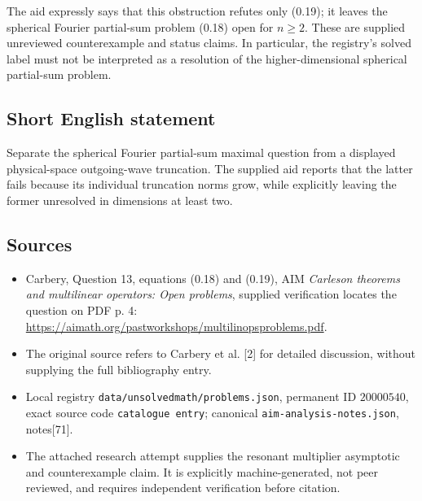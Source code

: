 \documentclass[11pt]{article}
\begin{document}
The aid expressly says that this obstruction refutes only (0.19); it leaves the spherical Fourier partial-sum problem (0.18) open for \(n\geq2\). These are supplied unreviewed counterexample and status claims. In particular, the registry's solved label must not be interpreted as a resolution of the higher-dimensional spherical partial-sum problem.
\subsection{Short English statement}
Separate the spherical Fourier partial-sum maximal question from a displayed physical-space outgoing-wave truncation. The supplied aid reports that the latter fails because its individual truncation norms grow, while explicitly leaving the former unresolved in dimensions at least two.
\subsection{Sources}
\begin{itemize}
\item Carbery, Question 13, equations (0.18) and (0.19), AIM \emph{Carleson theorems and multilinear operators: Open problems}, supplied verification locates the question on PDF p. 4: \url{https://aimath.org/pastworkshops/multilinopsproblems.pdf}.
\item The original source refers to Carbery et al. [2] for detailed discussion, without supplying the full bibliography entry.
\item Local registry \texttt{data/unsolvedmath/problems.json}, permanent ID \(20000540\), exact source code \texttt{catalogue entry}; canonical \texttt{aim-analysis-notes.json}, notes[71].
\item The attached research attempt supplies the resonant multiplier asymptotic and counterexample claim. It is explicitly machine-generated, not peer reviewed, and requires independent verification before citation.
\end{itemize}
\end{document}
